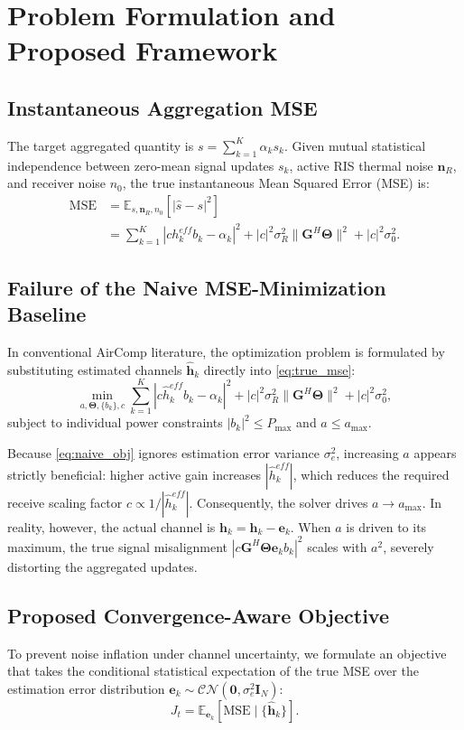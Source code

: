 \documentclass[journal,twocolumn]{IEEEtran}
\begin{document}
\section{Problem Formulation and Proposed Framework}

\subsection{Instantaneous Aggregation MSE}
The target aggregated quantity is $s = \sum_{k=1}^K \alpha_k s_k$. Given mutual statistical independence between zero-mean signal updates $s_k$, active RIS thermal noise $\mathbf{n}_R$, and receiver noise $n_0$, the true instantaneous Mean Squared Error (MSE) is:
\begin{align}
    \text{MSE} &= \mathbb{E}_{s, \mathbf{n}_R, n_0}\left[|\hat{s} - s|^2\right] \nonumber \\
    &= \sum_{k=1}^K |c h_k^{eff} b_k - \alpha_k|^2 + |c|^2 \sigma_R^2 \|\mathbf{G}^H \mathbf{\Theta}\|^2 + |c|^2 \sigma_0^2.
    \label{eq:true_mse}
\end{align}

\subsection{Failure of the Naive MSE-Minimization Baseline}
In conventional AirComp literature, the optimization problem is formulated by substituting estimated channels $\hat{\mathbf{h}}_k$ directly into \eqref{eq:true_mse}:
\begin{equation}
    \min_{a, \mathbf{\Theta}, \{b_k\}, c} \sum_{k=1}^K |c \hat{h}_k^{eff} b_k - \alpha_k|^2 + |c|^2 \sigma_R^2 \|\mathbf{G}^H \mathbf{\Theta}\|^2 + |c|^2 \sigma_0^2,
    \label{eq:naive_obj}
\end{equation}
subject to individual power constraints $|b_k|^2 \le P_{\max}$ and $a \le a_{\max}$.

Because \eqref{eq:naive_obj} ignores estimation error variance $\sigma_e^2$, increasing $a$ appears strictly beneficial: higher active gain increases $|\hat{h}_k^{eff}|$, which reduces the required receive scaling factor $c \propto 1/|\hat{h}_k^{eff}|$. Consequently, the solver drives $a \to a_{\max}$. In reality, however, the actual channel is $\mathbf{h}_k = \hat{\mathbf{h}}_k - \mathbf{e}_k$. When $a$ is driven to its maximum, the true signal misalignment $|c \mathbf{G}^H \mathbf{\Theta} \mathbf{e}_k b_k|^2$ scales with $a^2$, severely distorting the aggregated updates.

\subsection{Proposed Convergence-Aware Objective}
To prevent noise inflation under channel uncertainty, we formulate an objective that takes the conditional statistical expectation of the true MSE over the estimation error distribution $\mathbf{e}_k \sim \mathcal{CN}(\mathbf{0}, \sigma_e^2 \mathbf{I}_N)$:
\begin{equation}
    J_t = \mathbb{E}_{\mathbf{e}_k}\left[\text{MSE} \mid \{\hat{\mathbf{h}}_k\}\right].
    \label{eq:expected_mse_def}
\end{equation}
\end{document}
